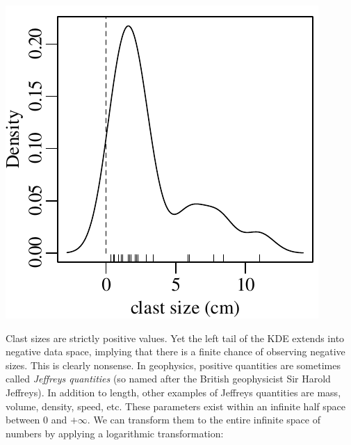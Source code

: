 \noindent\begin{minipage}[t][][b]{.3\textwidth}
  \includegraphics[width=\textwidth]{../figures/negativeKDE.pdf}\\
\end{minipage}
\begin{minipage}[t][][t]{.7\textwidth}
  \label{fig:negativeKDE}
\end{minipage}

Clast sizes are strictly positive values. Yet the left tail of the KDE
extends into negative data space, implying that there is a finite
chance of observing negative sizes.  This is clearly nonsense.  In
geophysics, positive quantities are sometimes called \emph{Jeffreys
  quantities} (so named after the British geophysicist Sir Harold
Jeffreys). In addition to length, other examples of Jeffreys
quantities are mass, volume, density, speed, etc. These parameters
exist within an infinite half space between 0 and $+\infty$. We can
transform them to the entire infinite space of numbers by applying a
logarithmic transformation:\\

